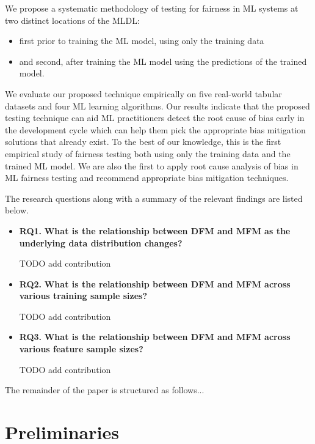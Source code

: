 \documentclass{article}
\begin{document}
We propose a systematic methodology of testing for fairness in ML
systems at two distinct locations of the MLDL:
\begin{itemize}
\item first prior to training the ML model, using only the training
  data
\item and second, after training the ML model using the predictions of
  the trained model.
\end{itemize}

We evaluate our proposed technique empirically on five real-world
tabular datasets and four ML learning algorithms. Our results indicate
that the proposed testing technique can aid ML practitioners detect
the root cause of bias early in the development cycle which can help
them pick the appropriate bias mitigation solutions that already
exist. To the best of our knowledge, this is the first empirical study
of fairness testing both using only the training data and the trained
ML model. We are also the first to apply root cause analysis of bias
in ML fairness testing and recommend appropriate bias mitigation
techniques.

The research questions along with a summary of the relevant findings
are listed below.

\begin{itemize}
\item{\textbf{RQ1.}} \textbf{What is the relationship between DFM and
  MFM as the underlying data distribution changes?}

  TODO add contribution
  
\item{\textbf{RQ2.}} \textbf{What is the relationship between DFM and
  MFM across various training sample sizes?}

  TODO add contribution
\item{\textbf{RQ3.}} \textbf{What is the relationship between DFM and
  MFM across various feature sample sizes?}

  TODO add contribution
\end{itemize}

The remainder of the paper is structured as follows...

\section{Preliminaries}\label{sec:related}

\end{document}
